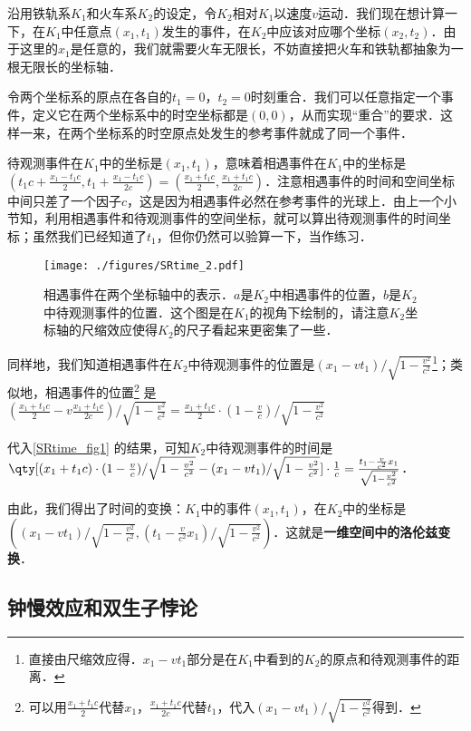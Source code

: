 沿用铁轨系$K_1$和火车系$K_2$的设定，令$K_2$相对$K_1$以速度$v$运动．我们现在想计算一下，在$K_1$中任意点$(x_1,t_1)$发生的事件，在$K_2$中应该对应哪个坐标$(x_2,t_2)$．由于这里的$x_1$是任意的，我们就需要火车无限长，不妨直接把火车和铁轨都抽象为一根无限长的坐标轴．

令两个坐标系的原点在各自的$t_1=0$，$t_2=0$时刻重合．我们可以任意指定一个事件，定义它在两个坐标系中的时空坐标都是$(0,0)$，从而实现“重合”的要求．这样一来，在两个坐标系的时空原点处发生的参考事件就成了同一个事件．

待观测事件在$K_1$中的坐标是$(x_1, t_1)$，意味着相遇事件在$K_1$中的坐标是$(t_1c+\frac{x_1-t_1c}{2}, t_1+\frac{x_1-t_1c}{2c})=(\frac{x_1+t_1c}{2},\frac{x_1+t_1c}{2c})$．注意相遇事件的时间和空间坐标中间只差了一个因子$c$，这是因为相遇事件必然在参考事件的光球上．由上一个小节知，利用相遇事件和待观测事件的空间坐标，就可以算出待观测事件的时间坐标；虽然我们已经知道了$t_1$，但你仍然可以验算一下，当作练习．

\begin{figure}[ht]
\centering
\texttt{[image: ./figures/SRtime\_2.pdf]}
\caption{相遇事件在两个坐标轴中的表示．$a$是$K_2$中相遇事件的位置，$b$是$K_2$中待观测事件的位置．这个图是在$K_1$的视角下绘制的，请注意$K_2$坐标轴的尺缩效应使得$K_2$的尺子看起来更密集了一些．} \label{SRtime_fig2}
\end{figure}

同样地，我们知道相遇事件在$K_2$中待观测事件的位置是$(x_1-vt_1)/\sqrt{1-\frac{v^2}{c^2}}$\footnote{直接由尺缩效应得．$x_1-vt_1$部分是在$K_1$中看到的$K_2$的原点和待观测事件的距离．}；类似地，相遇事件的位置\footnote{可以用$\frac{x_1+t_1c}{2}$代替$x_1$，$\frac{x_1+t_1c}{2c}$代替$t_1$，代入$(x_1-vt_1)/\sqrt{1-\frac{v^2}{c^2}}$得到．}  是$(\frac{x_1+t_1c}{2}-v\frac{x_1+t_1c}{2c})/\sqrt{1-\frac{v^2}{c^2}}=\frac{x_1+t_1c}{2}\cdot(1-\frac{v}{c})/\sqrt{1-\frac{v^2}{c^2}}$

代入\autoref{SRtime_fig1} 的结果，可知$K_2$中待观测事件的时间是$\qty[(x_1+t_1c)\cdot(1-\frac{v}{c})/\sqrt{1-\frac{v^2}{c^2}}-(x_1-vt_1)/\sqrt{1-\frac{v^2}{c^2}}]\cdot \frac{1}{c}=\frac{t_1-\frac{v}{c^2}x_1}{\sqrt{1-\frac{v^2}{c^2}}}$．

由此，我们得出了时间的变换：$K_1$中的事件$(x_1, t_1)$，在$K_2$中的坐标是$((x_1-vt_1)/\sqrt{1-\frac{v^2}{c^2}}, (t_1-\frac{v}{c^2}x_1)/\sqrt{1-\frac{v^2}{c^2}})$．这就是\textbf{一维空间中的洛伦兹变换}．

\subsection{钟慢效应和双生子悖论}

